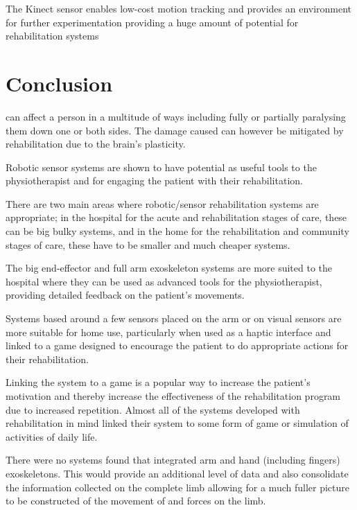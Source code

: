 \documentclass[journal]{IEEEtran}
\begin{document}
The Kinect sensor enables low-cost motion tracking and provides an environment 
for further experimentation providing a huge amount of potential for 
rehabilitation systems

\section{Conclusion}
 can affect a person in a multitude of ways including fully or 
partially paralysing them down one or both sides. The damage caused can however be 
mitigated by rehabilitation due to the brain's plasticity.

Robotic sensor systems are shown to have potential as useful tools to the 
physiotherapist and for engaging the patient with their rehabilitation.

There are two main areas where robotic/sensor rehabilitation systems are appropriate; 
in the hospital for the acute and rehabilitation stages of care, these can be big bulky 
systems, and in the home for the rehabilitation and community stages of care, these 
have to be smaller and much cheaper systems.

The big end-effector and full arm exoskeleton systems are more suited to the hospital 
where they can be used as advanced tools for the physiotherapist, providing detailed 
feedback on the patient's movements.

Systems based around a few sensors placed on the arm or on visual sensors are more 
suitable for home use, particularly when used as a haptic interface and linked to 
a game designed to encourage the patient to do appropriate actions for their 
rehabilitation. 

Linking the system to a game is a popular way to increase the patient's motivation and 
thereby increase the effectiveness of the rehabilitation program due to increased 
repetition. Almost all of the systems developed with rehabilitation in mind linked 
their system to some form of game or simulation of activities of daily life.

There were no systems found that integrated arm and hand (including fingers) exoskeletons. 
This would provide an additional level of data and also consolidate the information collected 
on the complete limb allowing for a much fuller picture to be constructed of the movement of 
and forces on the limb.


\end{document}
